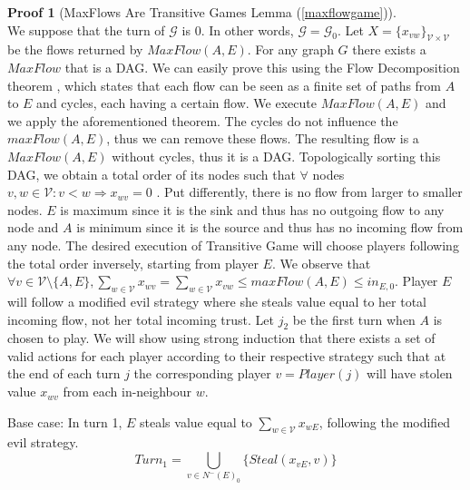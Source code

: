 \documentclass[11pt]{llncs}
\theoremstyle{definition}
\newtheorem*{sepproof}{Proof}
\begin{document}
    \begin{sepproof}[MaxFlows Are Transitive Games Lemma (\ref{maxflowgame})] \ \\
    \label{maxflowgameproof}
       We suppose that the turn of $\mathcal{G}$ is 0. In other words, $\mathcal{G} = \mathcal{G}_0$. Let
       $X = \{x_{vw}\}_{\mathcal{V} \times \mathcal{V}}$ be the flows returned by $MaxFlow\left(A, E\right)$. For any graph
       $G$ there exists a $MaxFlow$ that is a DAG. We can easily prove this using the Flow Decomposition theorem
       \cite{amo}, which states that each flow can be seen as a finite set of paths from $A$ to $E$ and cycles, each
       having a certain flow. We execute $MaxFlow\left(A, E\right)$ and we apply the aforementioned theorem. The
       cycles do not influence the $maxFlow\left(A, E\right)$, thus we can remove these flows. The resulting flow is a
       $MaxFlow\left(A, E\right)$ without cycles, thus it is a DAG. Topologically sorting this DAG, we obtain a total order
       of its nodes such that $\forall$ nodes $v, w \in \mathcal{V} : v < w \Rightarrow x_{wv} = 0$ \cite{clrs}. Put
       differently, there is no flow from larger to smaller nodes. $E$ is maximum since it is the sink and thus has no
       outgoing flow to any node and $A$ is minimum since it is the source and thus has no incoming flow from any node. The
       desired execution of Transitive Game will choose players following the total order inversely, starting from player
       $E$. We observe that $\forall v \in \mathcal{V} \setminus \{A, E\}, \sum\limits_{w \in \mathcal{V}}x_{wv} =
       \sum\limits_{w \in \mathcal{V}}x_{vw} \leq maxFlow\left(A, E\right) \leq in_{E, 0}$. Player $E$ will follow a modified
       evil strategy where she steals value equal to her total incoming flow, not her total incoming trust. Let $j_2$ be the
       first turn when $A$ is chosen to play. We will show using strong induction that there exists a set of valid actions
       for each player according to their respective strategy such that at the end of each turn $j$ the corresponding player
       $v = Player\left(j\right)$ will have stolen value $x_{wv}$ from each in-neighbour $w$.

       Base case: In turn 1, $E$ steals value equal to $\sum\limits_{w \in \mathcal{V}}x_{wE}$, following the modified evil
       strategy.
       \begin{equation*}
          Turn_1 = \bigcup\limits_{v \in N^{-}\left(E\right)_0}\{Steal\left(x_{vE}, v\right)\}
       \end{equation*}


\end{sepproof}
\end{document}
